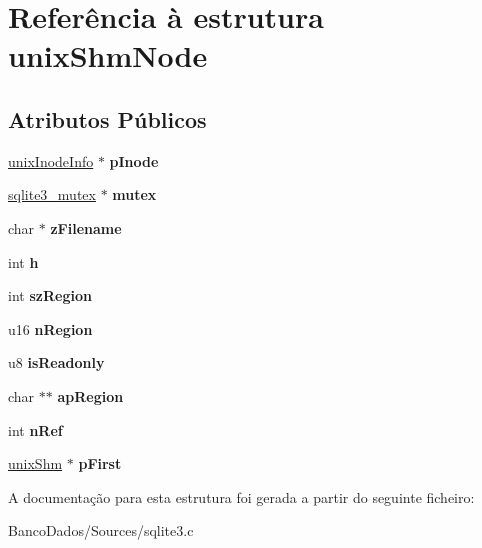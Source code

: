 \hypertarget{structunix_shm_node}{\section{Referência à estrutura unix\-Shm\-Node}
\label{structunix_shm_node}
}
\subsection*{Atributos Públicos}
\begin{DoxyCompactItemize}
\item 
\hypertarget{structunix_shm_node_ab6bc1cf84d65887a3395da6406843817}{\hyperlink{structunix_inode_info}{unix\-Inode\-Info} $\ast$ {\bfseries p\-Inode}}\label{structunix_shm_node_ab6bc1cf84d65887a3395da6406843817}

\item 
\hypertarget{structunix_shm_node_aa90850530f48fec6f2a872874f8ddf1f}{\hyperlink{structsqlite3__mutex}{sqlite3\-\_\-mutex} $\ast$ {\bfseries mutex}}\label{structunix_shm_node_aa90850530f48fec6f2a872874f8ddf1f}

\item 
\hypertarget{structunix_shm_node_a188c3bc5fcb4666ad0817ac093e7505d}{char $\ast$ {\bfseries z\-Filename}}\label{structunix_shm_node_a188c3bc5fcb4666ad0817ac093e7505d}

\item 
\hypertarget{structunix_shm_node_a9cd93c8052eb47f257e2d752e8f1fdba}{int {\bfseries h}}\label{structunix_shm_node_a9cd93c8052eb47f257e2d752e8f1fdba}

\item 
\hypertarget{structunix_shm_node_ae8126f9db70a758c2f340ec06869e02b}{int {\bfseries sz\-Region}}\label{structunix_shm_node_ae8126f9db70a758c2f340ec06869e02b}

\item 
\hypertarget{structunix_shm_node_aaf1fceb640b3959424403885c0419a46}{u16 {\bfseries n\-Region}}\label{structunix_shm_node_aaf1fceb640b3959424403885c0419a46}

\item 
\hypertarget{structunix_shm_node_ad241b0a85f01110310cea91aa38fccb2}{u8 {\bfseries is\-Readonly}}\label{structunix_shm_node_ad241b0a85f01110310cea91aa38fccb2}

\item 
\hypertarget{structunix_shm_node_a8eff550f9b10a2de463e9874f84efc5e}{char $\ast$$\ast$ {\bfseries ap\-Region}}\label{structunix_shm_node_a8eff550f9b10a2de463e9874f84efc5e}

\item 
\hypertarget{structunix_shm_node_a6d9f0c9dec3f6710cb09c90723a8284b}{int {\bfseries n\-Ref}}\label{structunix_shm_node_a6d9f0c9dec3f6710cb09c90723a8284b}

\item 
\hypertarget{structunix_shm_node_a0ddd6c4625acf5994a60b0c368bc665e}{\hyperlink{structunix_shm}{unix\-Shm} $\ast$ {\bfseries p\-First}}\label{structunix_shm_node_a0ddd6c4625acf5994a60b0c368bc665e}

\end{DoxyCompactItemize}


A documentação para esta estrutura foi gerada a partir do seguinte ficheiro\-:\begin{DoxyCompactItemize}
\item 
Banco\-Dados/\-Sources/sqlite3.\-c\end{DoxyCompactItemize}
